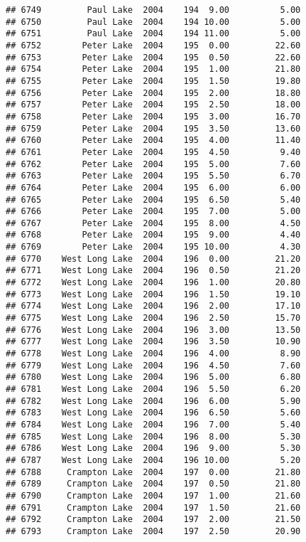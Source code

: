 \documentclass[
]{article}
\begin{document}
\begin{verbatim}
## 6749         Paul Lake  2004    194  9.00          5.00
## 6750         Paul Lake  2004    194 10.00          5.00
## 6751         Paul Lake  2004    194 11.00          5.00
## 6752        Peter Lake  2004    195  0.00         22.60
## 6753        Peter Lake  2004    195  0.50         22.60
## 6754        Peter Lake  2004    195  1.00         21.80
## 6755        Peter Lake  2004    195  1.50         19.80
## 6756        Peter Lake  2004    195  2.00         18.80
## 6757        Peter Lake  2004    195  2.50         18.00
## 6758        Peter Lake  2004    195  3.00         16.70
## 6759        Peter Lake  2004    195  3.50         13.60
## 6760        Peter Lake  2004    195  4.00         11.40
## 6761        Peter Lake  2004    195  4.50          9.40
## 6762        Peter Lake  2004    195  5.00          7.60
## 6763        Peter Lake  2004    195  5.50          6.70
## 6764        Peter Lake  2004    195  6.00          6.00
## 6765        Peter Lake  2004    195  6.50          5.40
## 6766        Peter Lake  2004    195  7.00          5.00
## 6767        Peter Lake  2004    195  8.00          4.50
## 6768        Peter Lake  2004    195  9.00          4.40
## 6769        Peter Lake  2004    195 10.00          4.30
## 6770    West Long Lake  2004    196  0.00         21.20
## 6771    West Long Lake  2004    196  0.50         21.20
## 6772    West Long Lake  2004    196  1.00         20.80
## 6773    West Long Lake  2004    196  1.50         19.10
## 6774    West Long Lake  2004    196  2.00         17.10
## 6775    West Long Lake  2004    196  2.50         15.70
## 6776    West Long Lake  2004    196  3.00         13.50
## 6777    West Long Lake  2004    196  3.50         10.90
## 6778    West Long Lake  2004    196  4.00          8.90
## 6779    West Long Lake  2004    196  4.50          7.60
## 6780    West Long Lake  2004    196  5.00          6.80
## 6781    West Long Lake  2004    196  5.50          6.20
## 6782    West Long Lake  2004    196  6.00          5.90
## 6783    West Long Lake  2004    196  6.50          5.60
## 6784    West Long Lake  2004    196  7.00          5.40
## 6785    West Long Lake  2004    196  8.00          5.30
## 6786    West Long Lake  2004    196  9.00          5.30
## 6787    West Long Lake  2004    196 10.00          5.20
## 6788     Crampton Lake  2004    197  0.00         21.80
## 6789     Crampton Lake  2004    197  0.50         21.80
## 6790     Crampton Lake  2004    197  1.00         21.60
## 6791     Crampton Lake  2004    197  1.50         21.60
## 6792     Crampton Lake  2004    197  2.00         21.50
## 6793     Crampton Lake  2004    197  2.50         20.90

\end{verbatim}
\end{document}
